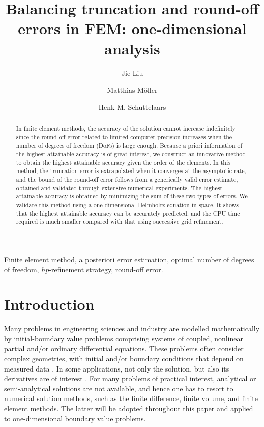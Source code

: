 \documentclass[review,3p]{elsarticle}
\begin{document}
\begin{frontmatter}

\title{Balancing truncation and round-off errors in FEM: one-dimensional analysis}

 \author[1]{Jie Liu}
 \author[1]{Matthias M\"oller}
 \author[1]{Henk M. Schuttelaars}
 
 \address[1]{Delft Institute of Applied Mathematics\\ Delft University of Technology\\ Van Mourik Broekmanweg 6, 2628 XE Delft, The Netherlands}

\begin{abstract}
In finite element methods, the accuracy of the solution cannot increase indefinitely since the round-off error related to limited computer precision increases when the number of degrees of freedom (DoFs) is large enough. Because a priori information of the highest attainable accuracy is of great interest, we construct an innovative method to obtain the highest attainable accuracy given the order of the elements.
In this method, the truncation error is extrapolated when it converges at the asymptotic rate, and the bound of the round-off error follows from a generically valid error estimate, obtained and validated through extensive numerical experiments. The highest attainable accuracy is obtained by minimizing the sum of these two types of errors.
We validate this method using a one-dimensional Helmholtz equation in space. 
It shows that the highest attainable accuracy can be accurately predicted, and the CPU time required is much smaller compared with that using successive grid refinement. 
\end{abstract}

\begin{keyword}
Finite element method, a posteriori error estimation, optimal number of degrees of freedom, $hp$-refinement strategy, round-off error.
\end{keyword}

\end{frontmatter}

\section{Introduction}

Many problems in engineering sciences and industry are modelled mathematically by initial-boundary value problems comprising systems of coupled, nonlinear partial and/or ordinary differential equations. These problems often consider complex geometries, with initial and/or boundary conditions that depend on measured data \cite{Kumar2016}. 
In some applications, not only the solution, but also its derivatives are of interest \cite{Kumar2016,carey1982derivative}.
For many problems of practical interest, analytical or semi-analytical solutions are not available, and hence one has to resort to numerical solution methods, such as the finite difference, finite volume, and finite element methods. The latter will be adopted throughout this paper and applied to one-dimensional boundary value problems.
\end{document}
